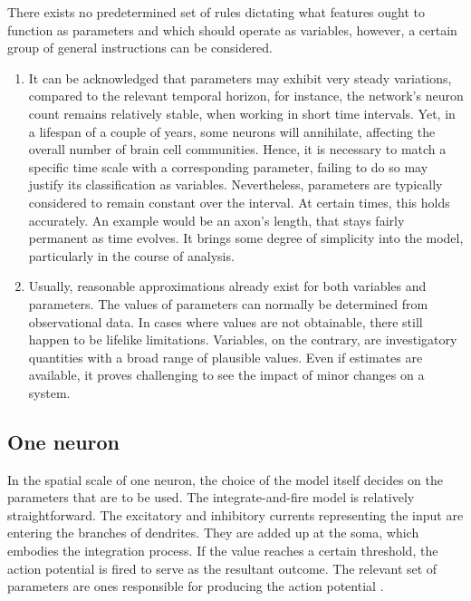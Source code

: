 \documentclass[class={myRUCProject}, crop=false]{standalone}
\begin{document}
There exists no predetermined set of rules dictating what features ought to function as parameters and which should operate as variables, however, a certain group of general instructions can be considered. 
\begin{enumerate}
\item It can be acknowledged that parameters may exhibit very steady variations, compared to the relevant temporal horizon, for instance, the network's neuron count remains relatively stable, when working in short time intervals. Yet, in a lifespan of a couple of years, some neurons will annihilate, affecting the overall number of brain cell communities. Hence, it is necessary to match a specific time scale with a corresponding parameter, failing to do so may justify its classification as variables. Nevertheless, parameters are typically considered to remain constant over the interval. At certain times, this holds accurately. An example would be an axon’s length, that stays fairly permanent as time evolves. It brings some degree of simplicity into the model, particularly in the course of analysis. 
\item Usually, reasonable approximations already exist for both variables and parameters. The values of parameters can normally be determined from observational data. In cases where values are not obtainable, there still happen to be lifelike limitations. Variables, on the contrary, are investigatory quantities with a broad range of plausible values. Even if estimates are available, it proves challenging to see the impact of minor changes on a system. 
\end{enumerate}

\subsection{One neuron}

In the spatial scale of one neuron, the choice of the model itself decides on the parameters that are to be used. The integrate-and-fire model is relatively straightforward. The excitatory and inhibitory currents representing the input are entering the branches of dendrites. They are added up at the soma, which embodies the integration process. If the value reaches a certain threshold, the action potential is fired to serve as the resultant outcome. The relevant set of parameters are ones responsible for producing the action potential \cite{}. 
\end{document}
